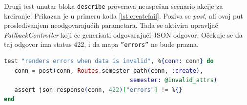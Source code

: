\documentclass[12pt,oneside]{memoir}
\begin{document}
\par Drugi test unutar bloka \texttt{describe} proverava neuspešan scenario akcije za kreiranje. Prikazan je u primeru koda \ref{lst:createfail}. Poziva se \emph{post}, ali ovaj put prosleđivanjem neodgovarajućih parametara. Tada se aktivira upravljač \emph{FallbackController} koji će generisati odgovarajući JSON odgovor. Očekuje se da taj odgovor ima status 422, i da mapa \texttt{''errors''} ne bude prazna. \\

\begin{minipage}{\linewidth}
\begin{lstlisting}[language=elixir, basicstyle=\small, caption={Testiranje akcije \emph{create} upravljača \emph{SemesterController}},captionpos=b, label={lst:createfail}]
test "renders errors when data is invalid", %{conn: conn} do
   conn = post(conn, Routes.semester_path(conn, :create), 
   				                    semester: @invalid_attrs)
   assert json_response(conn, 422)["errors"] != %{}
end
\end{lstlisting}
\end{minipage}
\end{document}
